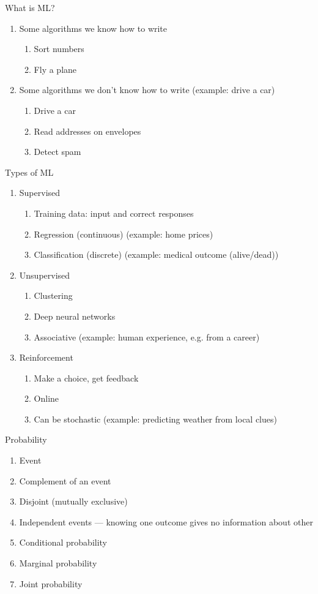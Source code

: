 




What is ML?
\begin{enumerate}
\item Some algorithms we know how to write
  \begin{enumerate}
  \item Sort numbers
  \item Fly a plane
  \end{enumerate}
\item Some algorithms we don't know how to write (example: drive a car)
  \begin{enumerate}
  \item Drive a car 
  \item Read addresses on envelopes
  \item Detect spam
  \end{enumerate}
\end{enumerate}

Types of ML
\begin{enumerate}
\item Supervised
  \begin{enumerate}
  \item Training data: input and correct responses
  \item Regression (continuous) (example: home prices)
  \item Classification (discrete) (example: medical outcome (alive/dead))
  \end{enumerate}
\item Unsupervised
  \begin{enumerate}
  \item Clustering
  \item Deep neural networks
  \item Associative (example: human experience, e.g. from a career)
  \end{enumerate}
\item Reinforcement
  \begin{enumerate}
  \item Make a choice, get feedback
  \item Online
  \item Can be stochastic (example: predicting weather from local clues)
  \end{enumerate}
\end{enumerate}

Probability
\begin{enumerate}
\item Event
\item Complement of an event
\item Disjoint (mutually exclusive)
\item Independent events --- knowing one outcome gives no information about other
\item Conditional probability
\item Marginal probability
\item Joint probability
\end{enumerate}



